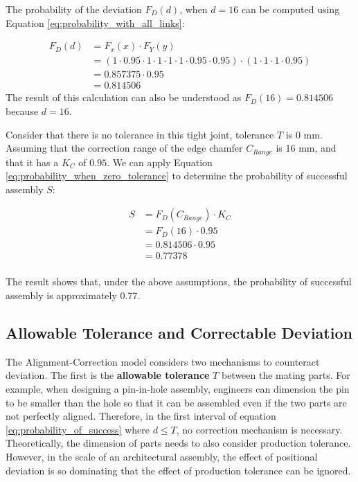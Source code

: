 The probability of the deviation $F_D(d)$, when $d = 16$ can be computed using Equation \ref{eq:probability_with_all_links}:

\begin{align}
    F_D(d) &= F_x(x) \cdot F_Y(y) \nonumber\\
      &= (1 \cdot 0.95 \cdot 1 \cdot 1 \cdot 1 \cdot 1 \cdot 0.95 \cdot 0.95) \cdot (1 \cdot 1 \cdot 1 \cdot 0.95)\nonumber\\
      &= 0.857375 \cdot 0.95\nonumber\\
      &= 0.814506\nonumber
\end{align}
The result of this calculation can also be understood as $F_D(16) = 0.814506$ because $d = 16$.

Consider that there is no tolerance in this tight joint, tolerance $T$ is 0 mm. Assuming that the correction range of the edge chamfer $C_{Range}$ is 16 mm, and that it has a $K_C$ of $0.95$. We can apply Equation \ref{eq:probability_when_zero_tolerance} to determine the probability of successful assembly $S$:

\begin{align}
    S &= F_D(C_{Range}) \cdot K_C \nonumber\\
      &= F_D(16) \cdot 0.95 \nonumber\\
      &=  0.814506 \cdot 0.95 \nonumber\\
      &= 0.77378 \nonumber\\
\end{align}

The result shows that, under the above assumptions, the probability of successful assembly is approximately 0.77. 

\subsection{Allowable Tolerance and Correctable Deviation}
\label{subsection:new_hypo_allowable_tolerance_and_correctable_deviation}

The Alignment-Correction model considers two mechanisms to counteract deviation. The first is the \textbf{allowable tolerance} $T$ between the mating parts. For example, when designing a pin-in-hole assembly, engineers can dimension the pin to be smaller than the hole so that it can be assembled even if the two parts are not perfectly aligned. Therefore, in the first interval of equation \ref{eq:probability_of_success} where $ d \leq T$, no correction mechanism is necessary. Theoretically, the dimension of parts needs to also consider production tolerance. However, in the scale of an architectural assembly, the effect of positional deviation is so dominating that the effect of production tolerance can be ignored.

